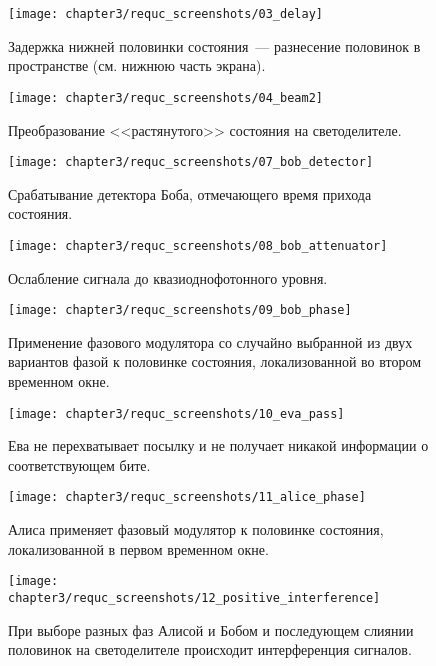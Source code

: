 \begin{figure}[h]
  \texttt{[image: chapter3/requc\_screenshots/03\_delay]}
  \caption{Задержка нижней половинки состояния~--- разнесение половинок в пространстве (см. нижнюю часть экрана).}
\end{figure}

\begin{figure}[h]
  \texttt{[image: chapter3/requc\_screenshots/04\_beam2]}
  \caption{Преобразование <<растянутого>> состояния на светоделителе.}
\end{figure}

\begin{figure}[h]
  \texttt{[image: chapter3/requc\_screenshots/07\_bob\_detector]}
  \caption{Срабатывание детектора Боба, отмечающего время прихода состояния.}
\end{figure}

\begin{figure}[h]
  \texttt{[image: chapter3/requc\_screenshots/08\_bob\_attenuator]}
  \caption{Ослабление сигнала до квазиоднофотонного уровня.}
\end{figure}

\begin{figure}[h]
  \texttt{[image: chapter3/requc\_screenshots/09\_bob\_phase]}
  \caption{Применение фазового модулятора со случайно выбранной из двух вариантов фазой к половинке состояния, локализованной во втором временном окне.}
\end{figure}

\begin{figure}[h]
  \texttt{[image: chapter3/requc\_screenshots/10\_eva\_pass]}
  \caption{Ева не перехватывает посылку и не получает никакой информации о соответствующем бите.}
\end{figure}

\begin{figure}[h]
  \texttt{[image: chapter3/requc\_screenshots/11\_alice\_phase]}
  \caption{Алиса применяет фазовый модулятор к половинке состояния, локализованной в первом временном окне.}
\end{figure}

\begin{figure}[h]
  \texttt{[image: chapter3/requc\_screenshots/12\_positive\_interference]}
  \caption{При выборе разных фаз Алисой и Бобом и последующем слиянии половинок на светоделителе происходит интерференция сигналов.}
\end{figure}

